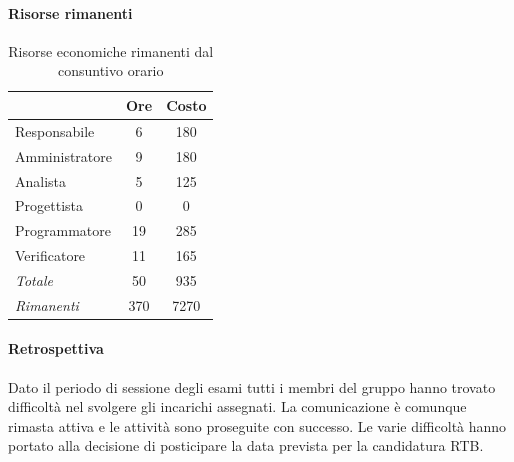 \documentclass[a4paper,12pt]{article}
\begin{document}
            \paragraph{Risorse rimanenti}
                \begin{table}[H]
                \centering
                \begin{tabular}{|l|c|c|}
                \hline
                    \rowcolor{lightgray}{\textbf{Ruolo}} & {\textbf{Ore}} & {\textbf{Costo}}\\
                \hline
                    Responsabile & 6 & 180\\
                \hline
                    Amministratore & 9 & 180\\
                \hline
                    Analista & 5 & 125\\
                \hline
                    Progettista & 0 & 0\\
                \hline
                    Programmatore & 19 & 285\\
                \hline
                    Verificatore & 11 & 165\\
                \hline
                    \rowcolor{lightgray}\textit{Totale} & 50 & 935\\
                \hline
                    \rowcolor{lightgray}\textit{Rimanenti} & 370 & 7270\\
                \hline
                \end{tabular}
                \caption{Risorse economiche rimanenti dal consuntivo orario}
                \end{table}
                
            \paragraph{Retrospettiva}
            Dato il periodo di sessione degli esami tutti i membri del gruppo hanno trovato difficoltà nel svolgere gli incarichi assegnati. La comunicazione è comunque rimasta attiva e le attività sono proseguite con successo. Le varie difficoltà hanno portato alla decisione di posticipare la data prevista per la candidatura RTB.

\end{document}
